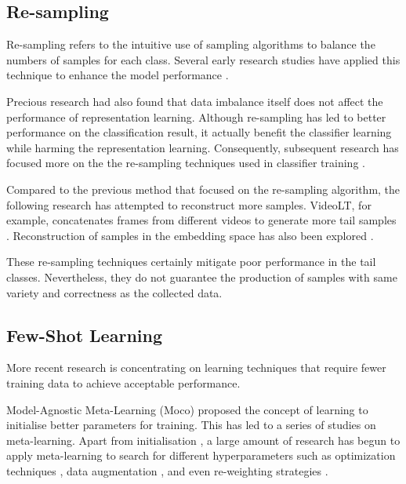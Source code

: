 \subsection{Re-sampling}
Re-sampling refers to the intuitive use of sampling algorithms to balance the numbers of samples for each class. Several early research studies have applied this technique to enhance the model performance \parencite{shen2016relay, 5128907, mahajan2018exploring}.

Precious research had also found that data imbalance itself does not affect the performance of representation learning. Although re-sampling has led to better performance on the classification result, it actually benefit the classifier learning while harming the representation learning. Consequently, subsequent research has focused more on the the re-sampling techniques used in classifier training \parencite{zhou2020bbn, kang2019decoupling}.

Compared to the previous method that focused on the re-sampling algorithm, the following research has attempted to reconstruct more samples. VideoLT, for example, concatenates frames from different videos to generate more tail samples \parencite{zhang2021videolt}. Reconstruction of samples in the embedding space has also been explored \parencite{liu2022long, perrett2023use}.

These re-sampling techniques certainly mitigate poor performance in the tail classes. Nevertheless, they do not guarantee the production of samples with same variety and correctness as the collected data.

\subsection{Few-Shot Learning}
More recent research is concentrating on learning techniques that require fewer training data to achieve acceptable performance.

Model-Agnostic Meta-Learning (Moco) \parencite{finn2017model} proposed the concept of learning to initialise better parameters for training. This has led to a series of studies on meta-learning. Apart from initialisation \parencite{nichol2018first, 2018Reptile}, a large amount of research has begun to apply meta-learning to search for different hyperparameters such as optimization techniques \parencite{andrychowicz2016learning}, data augmentation \parencite{li2020dada, galashov2022data, cubuk2018autoaugment}, and even re-weighting strategies \parencite{shu2019meta}.

